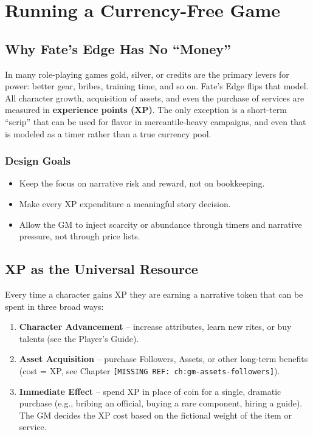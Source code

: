 \chapter{Running a Currency-Free Game}
\label{ch:gm-currency-free}

\section{Why Fate's Edge Has No ``Money''}
In many role-playing games gold, silver, or credits are the primary levers for power: better gear, bribes, training time, and so on. Fate's Edge flips that model. All character growth, acquisition of assets, and even the purchase of services are measured in \textbf{experience points (XP)}. The only exception is a short-term ``scrip'' that can be used for flavor in mercantile-heavy campaigns, and even that is modeled as a timer rather than a true currency pool.

\subsection{Design Goals}
\begin{itemize}
  \item Keep the focus on narrative risk and reward, not on bookkeeping.
  \item Make every XP expenditure a meaningful story decision.
  \item Allow the GM to inject scarcity or abundance through timers and narrative pressure, not through price lists.
\end{itemize}

\section{XP as the Universal Resource}
Every time a character gains XP they are earning a narrative token that can be spent in three broad ways:

\begin{enumerate}
  \item \textbf{Character Advancement} -- increase attributes, learn new rites, or buy talents (see the Player's Guide).
  \item \textbf{Asset Acquisition} -- purchase Followers, Assets, or other long-term benefits (cost = XP, see Chapter \texttt{[MISSING REF: ch:gm-assets-followers]}).
  \item \textbf{Immediate Effect} -- spend XP in place of coin for a single, dramatic purchase (e.g., bribing an official, buying a rare component, hiring a guide). The GM decides the XP cost based on the fictional weight of the item or service.
\end{enumerate}

